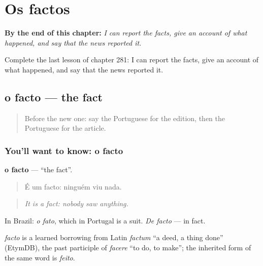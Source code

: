 
\chapter{Os factos}
\label{ch:pt-os-factos}

\begin{chapteropening}
\textbf{By the end of this chapter:} \emph{I can report the facts, give an account of what happened, and say that the news reported it.}

Complete the last lesson of chapter 281: I can report the facts, give an account of what happened, and say that the news reported it.
\end{chapteropening}

\section[o facto]{o facto — the fact}

\label{lesson:PT-C281-facto}



\begin{quote}
Before the new one: say the Portuguese for the edition, then the Portuguese for the article.
\end{quote}

\subsection*{You'll want to know: o facto}
\textbf{o facto} — \textquotedblleft{}the fact\textquotedblright{}.

\begin{quote}
É um facto: ninguém viu nada.
\end{quote}

\begin{quote}
\emph{It is a fact: nobody saw anything.}
\end{quote}

In Brazil: \emph{o fato}, which in Portugal is a suit. \emph{De facto} — in fact.

\begin{cousinweb}
\emph{facto} is a learned borrowing from Latin \emph{factum} \textquotedblleft{}a deed, a thing done\textquotedblright{} (EtymDB), the past participle of \emph{facere} \textquotedblleft{}to do, to make\textquotedblright{}; the inherited form of the same word is \emph{feito}.
\end{cousinweb}

